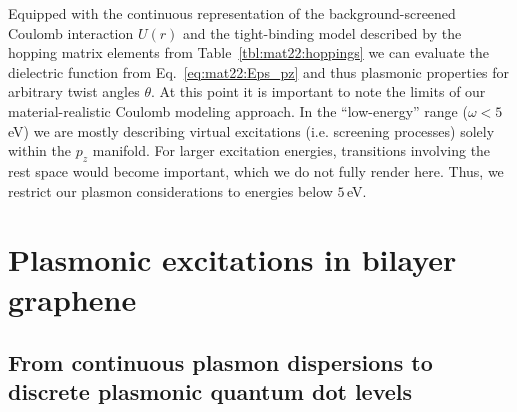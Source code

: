Equipped with the continuous representation of the background-screened Coulomb interaction $U(r)$ and the tight-binding model described by the hopping matrix elements from Table~\ref{tbl:mat22:hoppings} we can evaluate the dielectric function from Eq.~\eqref{eq:mat22:Eps_pz} and thus plasmonic properties for arbitrary twist angles $\theta$.  At this point it is important to note the limits of our material-realistic Coulomb modeling approach. In the ``low-energy'' range ($\omega < 5\,$eV) we are mostly describing virtual excitations (i.e. screening processes) solely within the $p_z$ manifold. For larger excitation energies, transitions involving the rest space would become important, which we do not fully render here. Thus, we restrict our plasmon considerations to energies below $5\,$eV.


\section{Plasmonic excitations in bilayer graphene}

\subsection{From continuous plasmon dispersions to discrete plasmonic quantum dot levels}\label{sec:mat22:from-continuous-plasmon}
        

